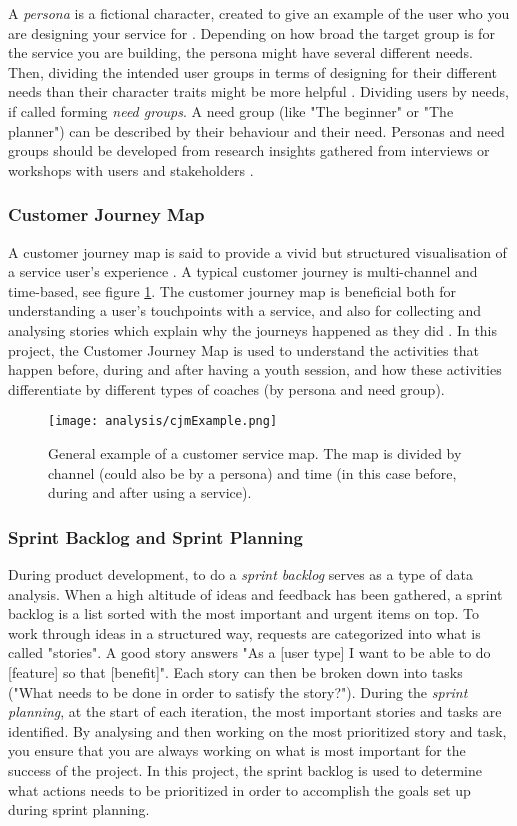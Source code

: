 A \textit{persona} is a fictional character, created to give an example of the user who you are designing your service for \citep{stickdorn}. Depending on how broad the target group is for the service you are building, the persona might have several different needs. Then, dividing the intended user groups in terms of designing for their different needs than their character traits might be more helpful \citep{expedition-mondial}. Dividing users by needs, if called forming \textit{need groups}. A need group (like "The beginner" or "The planner") can be described by their behaviour and their need. Personas and need groups should be developed from research insights gathered from interviews or workshops with users and stakeholders \citep{stickdorn}.

\subsubsection{Customer Journey Map}
A customer journey map is said to provide a vivid but structured visualisation of a service user's experience \citep{stickdorn}. A typical customer journey is multi-channel and time-based, see figure \ref{fig:cjmExample}. The customer journey map is beneficial both for understanding a user's touchpoints with a service, and also for collecting and analysing stories which explain why the journeys happened as they did \citep{stickdorn}. In this project, the Customer Journey Map is used to understand the activities that happen before, during and after having a youth session, and how these activities differentiate by different types of coaches (by persona and need group).

\begin{figure}[h]
    \centering
    \texttt{[image: analysis/cjmExample.png]}
    \caption{General example of a customer service map. The map is divided by channel (could also be by a persona) and time (in this case before, during and after using a service).}
    \label{fig:cjmExample}
\end{figure}

\subsubsection{Sprint Backlog and Sprint Planning}
During product development, to do a \textit{sprint backlog} serves as a type of data analysis. When a high altitude of ideas and feedback has been gathered, a sprint backlog is a list sorted with the most important and urgent items on top. To work through ideas in a structured way, requests are categorized into what is called "stories". A good story answers "As a [user type] I want to be able to do [feature] so that [benefit]". Each story can then be broken down into tasks ("What needs to be done in order to satisfy the story?"). During the \textit{sprint planning}, at the start of each iteration, the most important stories and tasks are identified. By analysing and then working on the most prioritized story and task, you ensure that you are always working on what is most important for the success of the project. In this project, the sprint backlog is used to determine what actions needs to be prioritized in order to accomplish the goals set up during sprint planning.

